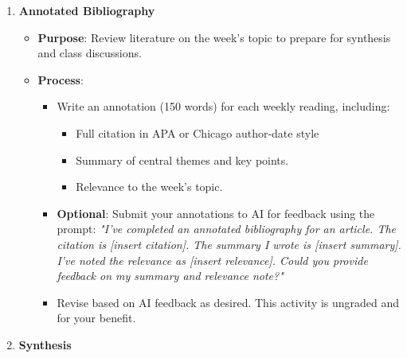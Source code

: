 \documentclass[12pt, letterpaper]{article}
\newenvironment{boldnumlist}
{\begin{enumerate}[label=\textbf{\arabic*.}]}
{\end{enumerate}}
\begin{document}
\begin{boldnumlist}
\item \textbf{Annotated Bibliography}

\begin{itemize}
    \item \textbf{Purpose}: Review literature on the week's topic to prepare for synthesis and class discussions.
    \item \textbf{Process}:
    \begin{itemize}
        \item Write an annotation (150 words) for each weekly reading, including:
        \begin{itemize}
            \item Full citation in APA or Chicago author-date style
            \item Summary of central themes and key points.
            \item Relevance to the week's topic.
        \end{itemize}
        \item \textbf{Optional}: Submit your annotations to AI for feedback using the prompt:
        \textit{"I've completed an annotated bibliography for an article. The citation is [insert citation]. The summary I wrote is [insert summary]. I've noted the relevance as [insert relevance]. Could you provide feedback on my summary and relevance note?"}
        \item Revise based on AI feedback as desired. This activity is ungraded and for your benefit.
    \end{itemize}
\end{itemize}

\item \textbf{Synthesis}


\end{boldnumlist}
\end{document}
